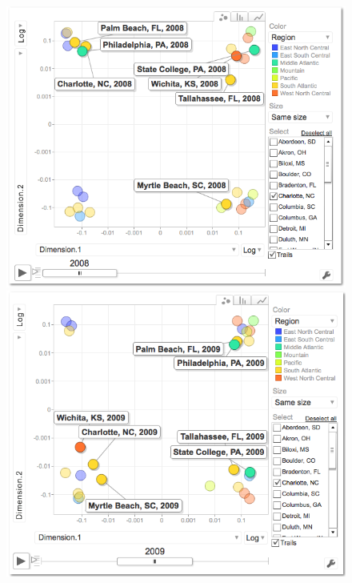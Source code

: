 \documentclass[11pt]{asaproc}
\begin{document}
\begin{figure}[H]
\begin{framed}
\begin{minipage}[b]{0.45\linewidth}
\centering
\includegraphics[width=\textwidth]{mdssd08.png}
\end{minipage}
\hspace{0.5cm}
\begin{minipage}[b]{0.45\linewidth}
\centering
\includegraphics[width=\textwidth]{mdssd09.png}
\end{minipage}

\end{framed}
\end{figure}
\end{document}
